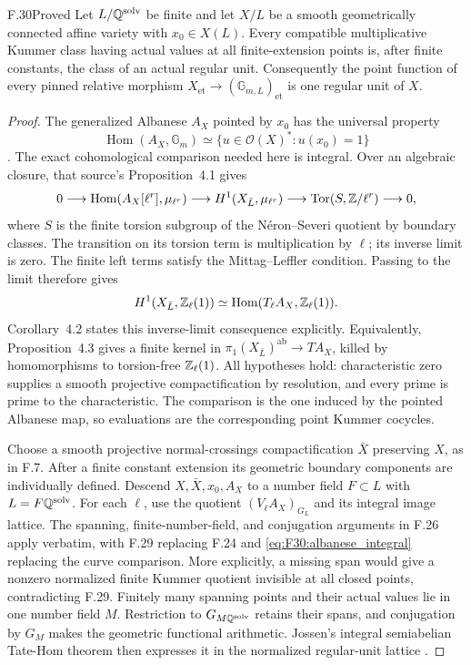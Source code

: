 \begin{claim}{F.30}{Proved}
Let $L/\mathbb Q^{\mathrm{solv}}$ be finite and let $X/L$ be a smooth
geometrically connected affine variety with $x_0\in X(L)$.
Every compatible multiplicative Kummer class having actual
values at all finite-extension points is, after finite constants,
the class of an actual regular unit. Consequently the point
function of every pinned relative morphism
$X_{\mathrm{et}}\to(\mathbb G_{m,L})_{\mathrm{et}}$ is one
regular unit of $X$.
\end{claim}
\begin{proof}
The generalized Albanese $A_X$ pointed by $x_0$ has the
universal property
\[
 \operatorname{Hom}(A_X,\mathbb G_m)
 \simeq\{u\in\mathcal O(X)^*:u(x_0)=1\}
\]
\citep[Section~3]{F_SpiessSzamuely2003}. The exact cohomological
comparison needed here is integral. Over an algebraic closure,
that source's Proposition~4.1 gives
\[
 0\longrightarrow
 \operatorname{Hom}(A_X[\ell^r],\mu_{\ell^r})
 \longrightarrow H^1(X_{\bar L},\mu_{\ell^r})
 \longrightarrow \operatorname{Tor}(S,\mathbb Z/\ell^r)
 \longrightarrow0,
\]
where $S$ is the finite torsion subgroup of the N\'eron--Severi
quotient by boundary classes. The transition on its torsion
term is multiplication by $\ell$; its inverse limit is zero.
The finite left terms satisfy the Mittag--Leffler condition.
Passing to the limit therefore gives
\begin{equation}\label{eq:F30:albanese_integral}
 H^1(X_{\bar L},\mathbb Z_\ell(1))
 \simeq\operatorname{Hom}(T_\ell A_X,\mathbb Z_\ell(1)).
\end{equation}
Corollary~4.2 states this inverse-limit consequence explicitly.
Equivalently, Proposition~4.3 gives a finite kernel in
$\pi_1(X_{\bar L})^{\mathrm{ab}}\to T A_X$, killed by
homomorphisms to torsion-free $\mathbb Z_\ell(1)$.
All hypotheses hold: characteristic zero supplies a smooth
projective compactification by resolution, and every prime is
prime to the characteristic. The comparison is the one induced
by the pointed Albanese map, so evaluations are the corresponding
point Kummer cocycles.

Choose a smooth projective normal-crossings compactification
$\bar X$ preserving $X$, as in F.7. After a finite constant
extension its geometric boundary components are individually
defined. Descend $X,\bar X,x_0,A_X$ to a number field
$F\subset L$ with $L=F\mathbb Q^{\mathrm{solv}}$.
For each $\ell$, use the quotient
$(V_\ell A_X)_{G_L}$ and its integral image lattice.
The spanning, finite-number-field, and conjugation arguments
in F.26 apply verbatim, with F.29 replacing F.24 and
\eqref{eq:F30:albanese_integral} replacing the curve comparison.
More explicitly, a missing span would give a nonzero normalized
finite Kummer quotient invisible at all closed points, contradicting
F.29. Finitely many spanning points and their actual values
lie in one number field $M$. Restriction to $G_{M\mathbb Q^{\mathrm{solv}}}$
retains their spans, and conjugation by $G_M$ makes the geometric
functional arithmetic. Jossen's integral semiabelian Tate-Hom
theorem then expresses it in the normalized regular-unit lattice
\citep[Lemma~6.3.2]{F_Jossen2009}.


\end{proof}
